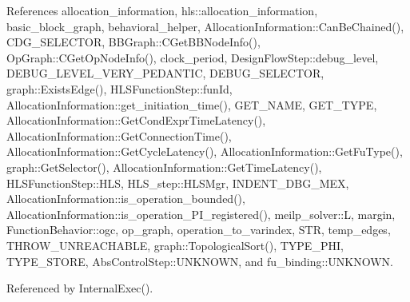 References allocation\+\_\+information, hls\+::allocation\+\_\+information, basic\+\_\+block\+\_\+graph, behavioral\+\_\+helper, Allocation\+Information\+::\+Can\+Be\+Chained(), C\+D\+G\+\_\+\+S\+E\+L\+E\+C\+T\+OR, B\+B\+Graph\+::\+C\+Get\+B\+B\+Node\+Info(), Op\+Graph\+::\+C\+Get\+Op\+Node\+Info(), clock\+\_\+period, Design\+Flow\+Step\+::debug\+\_\+level, D\+E\+B\+U\+G\+\_\+\+L\+E\+V\+E\+L\+\_\+\+V\+E\+R\+Y\+\_\+\+P\+E\+D\+A\+N\+T\+IC, D\+E\+B\+U\+G\+\_\+\+S\+E\+L\+E\+C\+T\+OR, graph\+::\+Exists\+Edge(), H\+L\+S\+Function\+Step\+::fun\+Id, Allocation\+Information\+::get\+\_\+initiation\+\_\+time(), G\+E\+T\+\_\+\+N\+A\+ME, G\+E\+T\+\_\+\+T\+Y\+PE, Allocation\+Information\+::\+Get\+Cond\+Expr\+Time\+Latency(), Allocation\+Information\+::\+Get\+Connection\+Time(), Allocation\+Information\+::\+Get\+Cycle\+Latency(), Allocation\+Information\+::\+Get\+Fu\+Type(), graph\+::\+Get\+Selector(), Allocation\+Information\+::\+Get\+Time\+Latency(), H\+L\+S\+Function\+Step\+::\+H\+LS, H\+L\+S\+\_\+step\+::\+H\+L\+S\+Mgr, I\+N\+D\+E\+N\+T\+\_\+\+D\+B\+G\+\_\+\+M\+EX, Allocation\+Information\+::is\+\_\+operation\+\_\+bounded(), Allocation\+Information\+::is\+\_\+operation\+\_\+\+P\+I\+\_\+registered(), meilp\+\_\+solver\+::L, margin, Function\+Behavior\+::ogc, op\+\_\+graph, operation\+\_\+to\+\_\+varindex, S\+TR, temp\+\_\+edges, T\+H\+R\+O\+W\+\_\+\+U\+N\+R\+E\+A\+C\+H\+A\+B\+LE, graph\+::\+Topological\+Sort(), T\+Y\+P\+E\+\_\+\+P\+HI, T\+Y\+P\+E\+\_\+\+S\+T\+O\+RE, Abs\+Control\+Step\+::\+U\+N\+K\+N\+O\+WN, and fu\+\_\+binding\+::\+U\+N\+K\+N\+O\+WN.



Referenced by Internal\+Exec().

